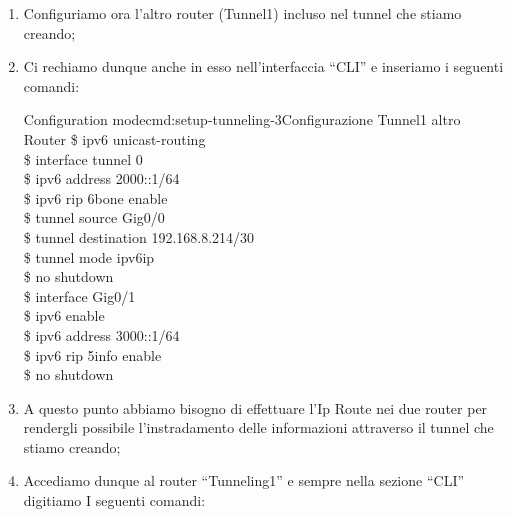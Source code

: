 \begin{enumerate}
    \begin{cmds}{Configuration mode}{cmd:setup-tunneling-2}{Configuratione Porte}
        \$ interface Gig0/1\\
        \$ ipv6 enable\\
        \$ ipv6 address 1000::1/64\\
        \$ ipv6 rip 6bone enable\\
        \$ no shutdown\\
        \$ exit\\
        \$ interface Gig0/0\\
        \$ ip address 192.168.8.214 255.255.255.252\\
        \$ no shutdown
    \end{cmds}
    \item Configuriamo ora l’altro router (Tunnel1) incluso nel tunnel che stiamo creando;
    \item Ci rechiamo dunque anche in esso nell’interfaccia “CLI” e inseriamo i seguenti comandi:\par
    \begin{cmds}{Configuration mode}{cmd:setup-tunneling-3}{Configurazione Tunnel1 altro Router}
        \$ ipv6 unicast-routing\\
        \$ interface tunnel 0\\
        \$ ipv6 address 2000::1/64\\
        \$ ipv6 rip 6bone enable\\
        \$ tunnel source Gig0/0\\
        \$ tunnel destination 192.168.8.214/30\\
        \$ tunnel mode ipv6ip\\
        \$ no shutdown\\
        \$ interface Gig0/1\\
        \$ ipv6 enable\\
        \$ ipv6 address 3000::1/64\\
        \$ ipv6 rip 5info enable\\
        \$ no shutdown
    \end{cmds}
    \item A questo punto abbiamo bisogno di effettuare l’Ip Route nei due router per rendergli possibile l’instradamento delle informazioni attraverso il tunnel che stiamo creando;
    \item Accediamo dunque al router “Tunneling1” e sempre nella sezione “CLI” digitiamo I seguenti comandi:\par

\end{enumerate}
